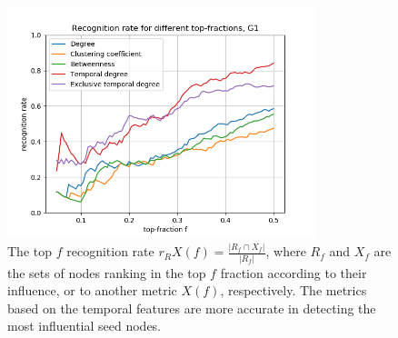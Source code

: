 \documentclass[letterpaper]{article}
\begin{document}
\begin{figure}[ht!]
  \centering
   \includegraphics[width=0.8\textwidth]{img/rankG.png}
   \caption{The top $f$ recognition rate $r_RX(f) = \frac{ |R_f \cap X_f| }{ |R_f| }$, where $R_f$ and $X_f$ are the sets of nodes ranking in the top $f$ fraction according to their influence,  or to another metric $X(f)$, respectively. The metrics based on the temporal features are more accurate in detecting the most influential seed nodes.}
   \label{fig:rankG}
\end{figure}
\end{document}
